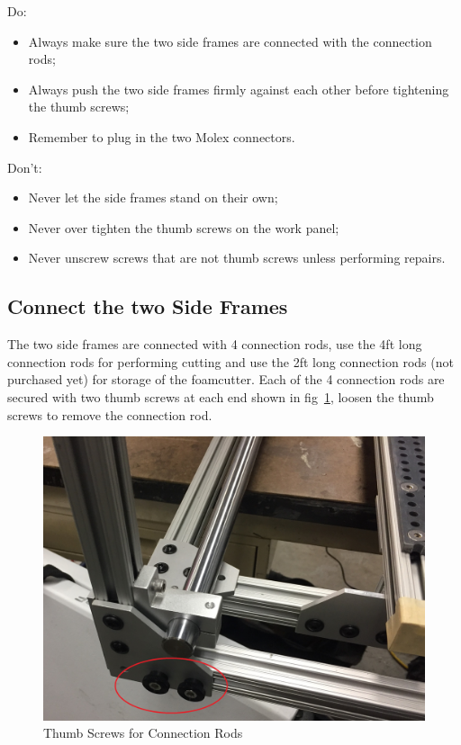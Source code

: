 \documentclass[titlepage,12pt,letter]{report}
\numberwithin{equation}{chapter}
\begin{document}
\begin{tcolorbox}
	{\large
\noindent Do:
\begin{itemize}[noitemsep,topsep=0pt]
	\item Always make sure the two side frames are connected with the connection rods;
	\item Always push the two side frames firmly against each other before tightening the thumb screws;
	\item Remember to plug in the two Molex connectors.
\end{itemize}

\noindent Don't:
\begin{itemize}[noitemsep,topsep=0pt]
	\item Never let the side frames stand on their own;
	\item Never over tighten the thumb screws on the work panel;
	\item Never unscrew screws that are not thumb screws unless performing repairs.
\end{itemize}
}
\end{tcolorbox}

\subsection{Connect the two Side Frames}
The two side frames are connected with 4 connection rods, use the 4ft long connection rods for performing cutting and use the 2ft long connection rods (not purchased yet) for storage of the foamcutter. Each of the 4 connection rods are secured with two thumb screws at each end shown in fig~\ref{fig:thumb_screw}, loosen the thumb screws to remove the connection rod. 

\begin{figure} [H]
	\includegraphics[width = 0.8\linewidth]{./Figures/thumb_screw.jpg}
	\caption{Thumb Screws for Connection Rods}
	\label{fig:thumb_screw}
\end{figure}
\end{document}
